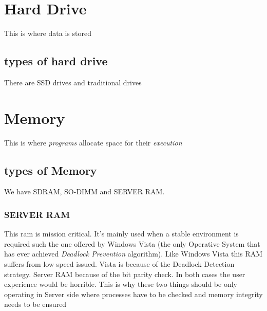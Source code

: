 \documentclass[a4paper,12pt]{article}
\begin{document}

\clearpage

\section{Hard Drive}
This is where data is stored
\subsection{types of hard drive}
There are SSD drives and traditional drives
\clearpage

\section{Memory}

This is where \emph{programs} allocate space for their \emph{execution}

\subsection{types of Memory}

We have SDRAM, SO-DIMM and SERVER RAM.

\subsubsection{SERVER RAM}
This ram is mission critical. It's mainly used when a stable environment is required such the one offered by Windows Vista (the only Operative System that has ever achieved \emph{Deadlock Prevention} algorithm).
Like Windows Vista this RAM suffers from low speed issued. Vista is because of the Deadlock Detection strategy. Server RAM because of the bit parity check. In both cases the user experience would be horrible. This is why these two things should be only operating in Server side where processes have to be checked and memory integrity needs to be ensured
\printindex
\end{document}
